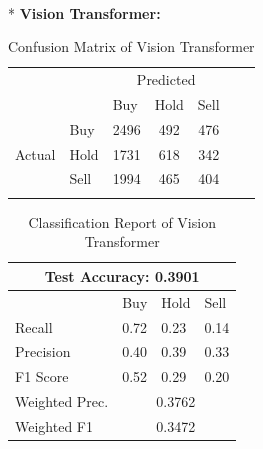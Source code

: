 \documentclass[]{article}
\begin{document}
\vspace{0.2cm}\\*
\textbf{Vision Transformer:}
\begin{table}[H]
    \centering
    \caption{Confusion Matrix of Vision Transformer}
    \begin{tabular}{llcccll}
        \cline{1-5}
        \multicolumn{1}{|l|}{} & \multicolumn{1}{l|}{} & \multicolumn{3}{c|}{Predicted} & & \\\cline{1-5} \multicolumn{1}{|l|}{} & \multicolumn{1}{l|}{} & \multicolumn{1}{l|}{Buy} & \multicolumn{1}{l|}{Hold} & \multicolumn{1}{l|}{Sell} & & \\\cline{1-5} \multicolumn{1}{|c|}{\multirow{3}{*}{Actual}} & \multicolumn{1}{l|}{Buy} & \multicolumn{1}{c|}{2496} & \multicolumn{1}{c|}{492} & \multicolumn{1}{c|}{476} & & \\\cline{2-5} \multicolumn{1}{|c|}{} & \multicolumn{1}{l|}{Hold} & \multicolumn{1}{c|}{1731} & \multicolumn{1}{c|}{618} & \multicolumn{1}{c|}{342} & & \\\cline{2-5} \multicolumn{1}{|c|}{} & \multicolumn{1}{l|}{Sell} & \multicolumn{1}{c|}{1994} & \multicolumn{1}{c|}{465} & \multicolumn{1}{c|}{404} & & \\\cline{1-5} & & \multicolumn{1}{l}{} & \multicolumn{1}{l}{} & \multicolumn{1}{l}{} & & 
    \end{tabular}
\end{table}
\begin{table}[H]
\centering
\caption{Classification Report of Vision Transformer}
\begin{tabular}{|llll|}
\hline
\multicolumn{4}{|c|}{Test Accuracy: 0.3901}                                                         \\ \hline
\multicolumn{1}{|l|}{}               & \multicolumn{1}{l|}{Buy}  & \multicolumn{1}{l|}{Hold} & Sell \\ \hline
\multicolumn{1}{|l|}{Recall}         & \multicolumn{1}{l|}{0.72} & \multicolumn{1}{l|}{0.23} & 0.14 \\ \hline
\multicolumn{1}{|l|}{Precision}      & \multicolumn{1}{l|}{0.40} & \multicolumn{1}{l|}{0.39} & 0.33 \\ \hline
\multicolumn{1}{|l|}{F1 Score}       & \multicolumn{1}{l|}{0.52} & \multicolumn{1}{l|}{0.29} & 0.20 \\ \hline
\multicolumn{1}{|l|}{Weighted Prec.} & \multicolumn{3}{c|}{0.3762}                                  \\ \hline
\multicolumn{1}{|l|}{Weighted F1}    & \multicolumn{3}{c|}{0.3472}                                  \\ \hline
\end{tabular}
\end{table}
\end{document}
